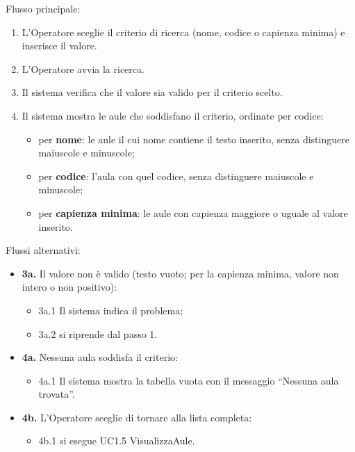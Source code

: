 \noindent Flusso principale:
\begin{enumerate}
\item L'Operatore sceglie il criterio di ricerca (nome, codice o capienza minima) e inserisce il valore.
\item L'Operatore avvia la ricerca.
\item Il sistema verifica che il valore sia valido per il criterio scelto.
\item Il sistema mostra le aule che soddisfano il criterio, ordinate per codice:
\begin{itemize}
\item per \textbf{nome}: le aule il cui nome contiene il testo inserito, senza distinguere maiuscole e minuscole;
\item per \textbf{codice}: l'aula con quel codice, senza distinguere maiuscole e minuscole;
\item per \textbf{capienza minima}: le aule con capienza maggiore o uguale al valore inserito.
\end{itemize}
\end{enumerate}
\noindent Flussi alternativi:
\begin{itemize}
\item \textbf{3a.} Il valore non è valido (testo vuoto; per la capienza minima, valore non intero o non positivo):
\begin{itemize}
\item 3a.1 Il sistema indica il problema;
\item 3a.2 si riprende dal passo 1.
\end{itemize}
\item \textbf{4a.} Nessuna aula soddisfa il criterio:
\begin{itemize}
\item 4a.1 Il sistema mostra la tabella vuota con il messaggio ``Nessuna aula trovata''.
\end{itemize}
\item \textbf{4b.} L'Operatore sceglie di tornare alla lista completa:
\begin{itemize}
\item 4b.1 si esegue UC1.5 VisualizzaAule.
\end{itemize}
\end{itemize}
